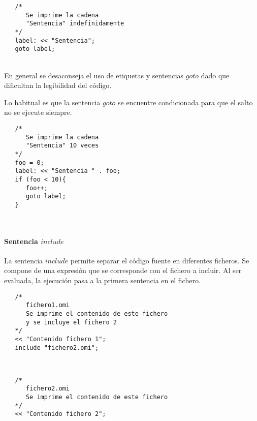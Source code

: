 \begin{lstlisting}
   /*
      Se imprime la cadena
      "Sentencia" indefinidamente
   */
   label: << "Sentencia";
   goto label;
\end{lstlisting}
\hfill\\

En general se desaconseja el uso de etiquetas y sentencias $goto$ dado que dificultan la legibilidad del código.

Lo habitual es que la sentencia $goto$ se encuentre condicionada para que el salto no se ejecute siempre. \\

\begin{lstlisting}
   /*
      Se imprime la cadena
      "Sentencia" 10 veces
   */
   foo = 0;
   label: << "Sentencia " . foo;
   if (foo < 10){
      foo++;
      goto label;
   }
\end{lstlisting}
\hfill\\


\paragraph{Sentencia $include$} \label{sec:stmt_include}
La sentencia $include$ permite separar el código fuente en diferentes ficheros. Se compone de una 
expresión que se corresponde con el fichero a incluir. Al ser evaluada,
la ejecución pasa a la primera sentencia en el fichero. \\

\begin{lstlisting}
   /*
      fichero1.omi
      Se imprime el contenido de este fichero
      y se incluye el fichero 2
   */
   << "Contenido fichero 1";
   include "fichero2.omi";
\end{lstlisting}
\hfill\\

\begin{lstlisting}
   /*
      fichero2.omi
      Se imprime el contenido de este fichero
   */
   << "Contenido fichero 2";
\end{lstlisting}
\hfill\\

